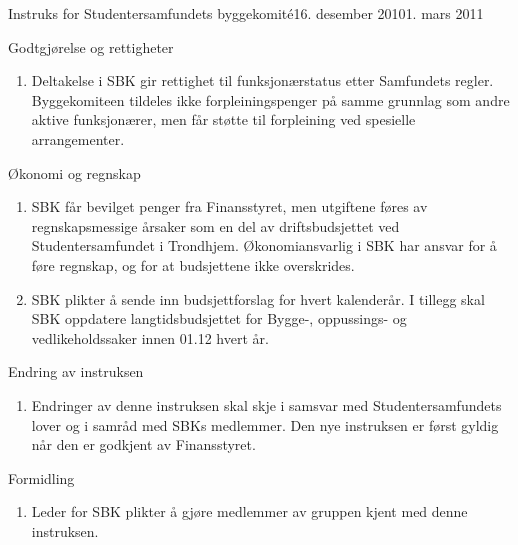 \documentclass[../fsbok.tex]{subfiles}
\begin{document}
\begin{instruks}{Instruks for Studentersamfundets byggekomité}{16. desember 2010}{1. mars 2011}
    \begin{instruksledd}{Godtgjørelse og rettigheter}
        \begin{enumerate}
		\item Deltakelse i SBK gir rettighet til funksjonærstatus etter Samfundets
		regler. Byggekomiteen tildeles ikke forpleiningspenger på samme grunnlag som andre aktive funksjonærer,
		men får støtte til forpleining ved spesielle arrangementer.
	\end{enumerate}
    \end{instruksledd}

    \begin{instruksledd}{Økonomi og regnskap}
        \begin{enumerate}
            \item SBK får bevilget penger fra Finansstyret, men utgiftene føres av
                regnskapsmessige årsaker som en del av
                driftsbudsjettet ved Studentersamfundet i Trondhjem. Økonomiansvarlig i SBK har
                ansvar for å føre
                regnskap, og for at budsjettene ikke overskrides.
            \item SBK plikter å sende inn budsjettforslag for hvert kalenderår. I tillegg skal
                SBK oppdatere langtidsbudsjettet
                for Bygge-, oppussings- og vedlikeholdssaker innen 01.12 hvert år.
        \end{enumerate}
    \end{instruksledd}

    \begin{instruksledd}{Endring av instruksen}
        \begin{enumerate}
            \item Endringer av denne instruksen skal skje i samsvar med Studentersamfundets lover
                og i samråd med SBKs
                medlemmer. Den nye instruksen er først gyldig når den er godkjent av Finansstyret.
        \end{enumerate}
    \end{instruksledd}

    \begin{instruksledd}{Formidling}
        \begin{enumerate}
            \item Leder for SBK plikter å gjøre medlemmer av gruppen kjent med denne
                instruksen.
        \end{enumerate}
    \end{instruksledd}


\end{instruks}
\end{document}
